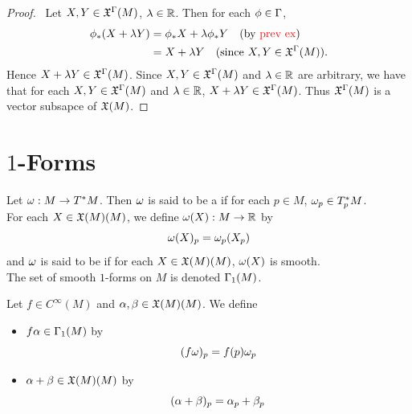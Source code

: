 \documentclass{book}
\begin{document}
\begin{proof}\
	Let $X, Y \in \mathfrak{X}^{\Gamma}(M)$, $\lambda \in \mathbb{R}$. Then for each $\phi \in \Gamma$,
	\begin{align*}
		\phi_*(X + \lambda Y)
		& = \phi_*X + \lambda \phi_*Y \quad \text{(by \textcolor{red}{prev ex})}\\
		& = X + \lambda Y \quad \text{(since $X,Y \in \mathfrak{X}^{\Gamma}(M)$)}.
	\end{align*}
	Hence $X + \lambda Y \in \mathfrak{X}^{\Gamma}(M)$. Since $X, Y \in \mathfrak{X}^{\Gamma}(M)$ and $\lambda \in \mathbb{R}$ are arbitrary, we have that for each $X, Y \in \mathfrak{X}^{\Gamma}(M)$ and $\lambda \in \mathbb{R}$,  $X + \lambda Y \in \mathfrak{X}^{\Gamma}(M)$. Thus $\mathfrak{X}^{\Gamma}(M)$ is a vector subsapce of $\mathfrak{X}(M)$. 
\end{proof}























\newpage
\section{$1$-Forms}

\begin{defn}
	Let $\omega: M \rightarrow T^*M$. Then $\omega$ is said to be a  if for each $p \in M$, $\omega_p \in T^*_p M$. \\
	For each $X \in \mathfrak{X}(M)(M)$, we define $\omega(X) : M \rightarrow \mathbb{R}$ by $$\omega(X)_p = \omega_p(X_p)$$
	and $\omega$ is said to be \tbf{smooth} if for each $X \in \mathfrak{X}(M)(M)$, $\omega(X)$ is smooth. \\
	The set of smooth $1$-forms on $M$ is denoted $\Gamma_1(M)$.\\
\end{defn}

\begin{defn}
	Let $f \in C^{\infty}(M)$ and $\alpha,\beta \in \mathfrak{X}(M)(M)$. We define 
	\begin{itemize}
		\item $f\alpha \in \Gamma_1(M)$ by $$(f\omega)_p = f(p)\omega_p$$
		\item $\alpha+\beta \in \mathfrak{X}(M)(M)$ by $$(\alpha+\beta)_p = \alpha_p+\beta_p$$
	\end{itemize}
\end{defn}
\end{document}
